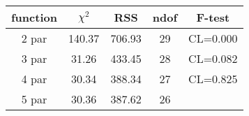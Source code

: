\begin{tabular}{c|c|c|c|c}
function & $\chi^2$ & RSS & ndof & F-test \\
\hline
2 par & 140.37 & 706.93 & 29 & CL=0.000 \\
3 par & 31.26 & 433.45 & 28 & CL=0.082 \\
4 par & 30.34 & 388.34 & 27 & CL=0.825 \\
5 par & 30.36 & 387.62 & 26 & \\
\hline
\end{tabular}